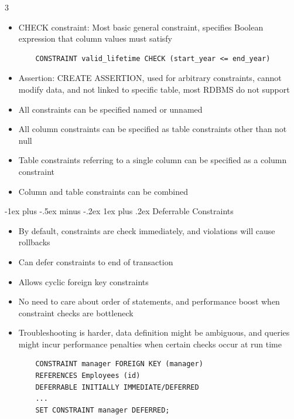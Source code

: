 \documentclass[10pt, landscape]{article}
\makeatletter
\renewcommand{\subsection}{\@startsection{subsection}{3}{0mm}%
                                {-1ex plus -.5ex minus -.2ex}%
                                {1ex plus .2ex}%
                                {\normalfont\small\bfseries}}%
\makeatother
\begin{document}
\begin{multicols*}{3}
\begin{itemize}
\begin{itemize}
        \item SET NULL: update foreign key to null
    \end{itemize}
    \item CHECK constraint: Most basic general constraint, specifies Boolean expression that column values must satisfy
    \begin{verbatim}
    CONSTRAINT valid_lifetime CHECK (start_year <= end_year)
    \end{verbatim}
    \item Assertion: CREATE ASSERTION, used for arbitrary constraints, cannot modify data, and not linked to specific table, most RDBMS do not support
    \item All constraints can be specified named or unnamed
    \item All column constraints can be specified as table constraints other than not null
    \item Table constraints referring to a single column can be specified as a column constraint
    \item Column and table constraints can be combined
\end{itemize}

\subsection{Deferrable Constraints}
\begin{itemize}
    \item By default, constraints are check immediately, and violations will cause rollbacks
    \item Can defer constraints to end of transaction
    \item Allows cyclic foreign key constraints
    \item No need to care about order of statements, and performance boost when constraint checks are bottleneck
    \item Troubleshooting is harder, data definition might be ambiguous, and queries might incur performance penalties when certain checks occur at run time
    \begin{verbatim}
    CONSTRAINT manager FOREIGN KEY (manager)
    REFERENCES Employees (id)
    DEFERRABLE INITIALLY IMMEDIATE/DEFERRED
    ...
    SET CONSTRAINT manager DEFERRED;
    \end{verbatim}
\end{itemize}


\end{multicols*}
\end{document}
